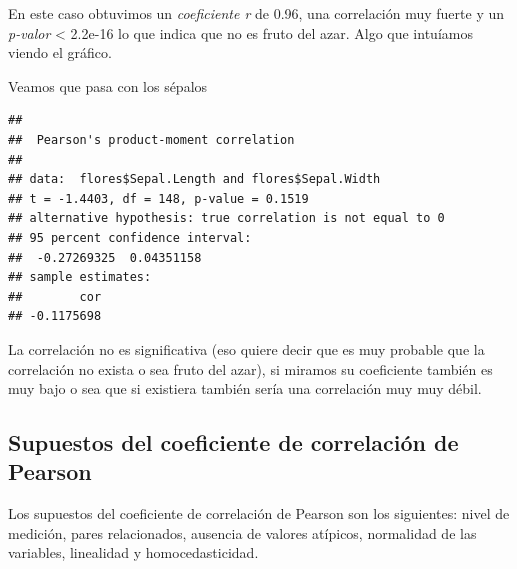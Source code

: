 \documentclass[
]{book}
\newenvironment{Shaded}{\begin{snugshade}}{\end{snugshade}}
\newcommand{\AttributeTok}[1]{\textcolor[rgb]{0.77,0.63,0.00}{#1}}
\newcommand{\FunctionTok}[1]{\textcolor[rgb]{0.00,0.00,0.00}{#1}}
\newcommand{\NormalTok}[1]{#1}
\newcommand{\SpecialCharTok}[1]{\textcolor[rgb]{0.00,0.00,0.00}{#1}}
\newcommand{\StringTok}[1]{\textcolor[rgb]{0.31,0.60,0.02}{#1}}
\begin{document}
En este caso obtuvimos un \emph{coeficiente r} de 0.96, una correlación muy fuerte y un \emph{p-valor} \textless{} 2.2e-16 lo que indica que no es fruto del azar. Algo que intuíamos viendo el gráfico.

Veamos que pasa con los sépalos

\begin{Shaded}
\end{Shaded}

\begin{verbatim}
## 
##  Pearson's product-moment correlation
## 
## data:  flores$Sepal.Length and flores$Sepal.Width
## t = -1.4403, df = 148, p-value = 0.1519
## alternative hypothesis: true correlation is not equal to 0
## 95 percent confidence interval:
##  -0.27269325  0.04351158
## sample estimates:
##        cor 
## -0.1175698
\end{verbatim}

La correlación no es significativa (eso quiere decir que es muy probable que la correlación no exista o sea fruto del azar), si miramos su coeficiente también es muy bajo o sea que si existiera también sería una correlación muy muy débil.

\hypertarget{supuestos-del-coeficiente-de-correlaciuxf3n-de-pearson}{%
\subsection{Supuestos del coeficiente de correlación de Pearson}\label{supuestos-del-coeficiente-de-correlaciuxf3n-de-pearson}}

Los supuestos del coeficiente de correlación de Pearson son los siguientes: nivel de medición, pares relacionados, ausencia de valores atípicos, normalidad de las variables, linealidad y homocedasticidad.
\end{document}
